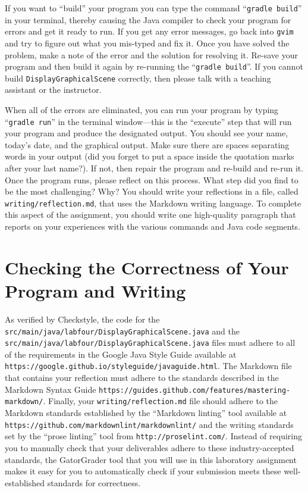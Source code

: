 \documentclass[11pt]{article}
\newcommand{\mainprogram}{\lstinline{DisplayGraphicalScene}}
\newcommand{\mainprogramsource}{\lstinline{src/main/java/labfour/DisplayGraphicalScene.java}}
\newcommand{\secondprogramsource}{\lstinline{src/main/java/labfour/DisplayGraphicalScene.java}}
\newcommand{\reflection}{\lstinline{writing/reflection.md}}
\newcommand{\gradlebuild}{\command{gradle build}}
\newcommand{\gradlerun}{\command{gradle run}}
\newcommand{\command}[1]{``\lstinline{#1}''}
\newcommand{\program}[1]{\lstinline{#1}}
\newcommand{\url}[1]{\lstinline{#1}}
\newcommand{\step}[1]{``{#1}''}
\begin{document}
If you want to \step{build} your program you can type the command \gradlebuild{} in your terminal, thereby causing the
Java compiler to check your program for errors and get it ready to run. If you get any error messages, go back into
\program{gvim} and try to figure out what you mis-typed and fix it. Once you have solved the problem, make a note of the
error and the solution for resolving it. Re-save your program and then build it again by re-running the \gradlebuild{}.
If you cannot build \mainprogram{} correctly, then please talk with a teaching assistant or the instructor.

When all of the errors are eliminated, you can run your program by typing \gradlerun{} in the terminal window---this is
the ``execute'' step that will run your program and produce the designated output. You should see your name, today's
date, and the graphical output. Make sure there are spaces separating words in your output (did you forget to put a
space inside the quotation marks after your last name?). If not, then repair the program and re-build and re-run it.
Once the program runs, please reflect on this process. What step did you find to be the most challenging? Why? You
should write your reflections in a file, called \reflection{}, that uses the Markdown writing language. To complete this
aspect of the assignment, you should write one high-quality paragraph that reports on your experiences with the various
commands and Java code segments.

\section*{Checking the Correctness of Your Program and Writing}

As verified by Checkstyle, the code for the \mainprogramsource{} and the \secondprogramsource{} files must adhere to all
of the requirements in the Google Java Style Guide available at
\url{https://google.github.io/styleguide/javaguide.html}. The Markdown file that contains your reflection must adhere to
the standards described in the Markdown Syntax Guide \url{https://guides.github.com/features/mastering-markdown/}.
Finally, your \reflection{} file should adhere to the Markdown standards established by the \step{Markdown linting} tool
available at \url{https://github.com/markdownlint/markdownlint/} and the writing standards set by the \step{prose
linting} tool from \url{http://proselint.com/}. Instead of requiring you to manually check that your deliverables adhere
to these industry-accepted standards, the GatorGrader tool that you will use in this laboratory assignment makes it easy
for you to automatically check if your submission meets these well-established standards for correctness.
\end{document}
